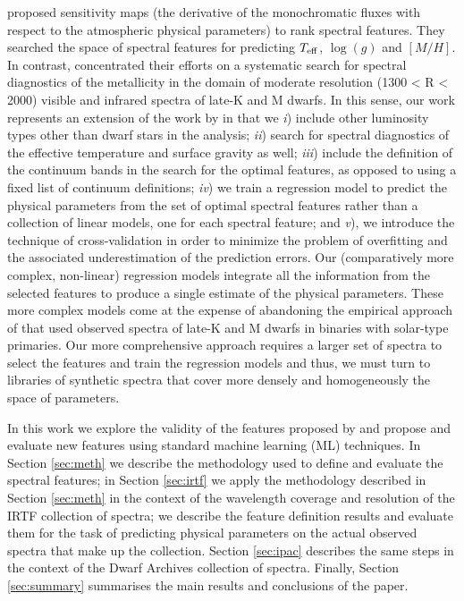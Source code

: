 \cite{cesetti} proposed sensitivity maps (the derivative of the
monochromatic fluxes with respect to the atmospheric physical
parameters) to rank spectral features. They searched the space of
spectral features for predicting $T_{\rm eff}$, $\log(g)$ and
$[M/H]$. In contrast, \cite{2013AJ....145...52M} concentrated their
efforts on a systematic search for spectral diagnostics of the
metallicity in the domain of moderate resolution (1300 < R < 2000)
visible and infrared spectra of late-K and M dwarfs. In this sense,
our work represents an extension of the work
by \cite{2013AJ....145...52M} in that we {\it i}) include other
luminosity types other than dwarf stars in the analysis; {\it ii})
search for spectral diagnostics of the effective temperature and
surface gravity as well; {\it iii}) include the definition of the
continuum bands in the search for the optimal features, as opposed to
using a fixed list of continuum definitions; {\it iv}) we train a
regression model to predict the physical parameters from the set of
optimal spectral features rather than a collection of linear models,
one for each spectral feature; and {\it v}), we introduce the
technique of cross-validation in order to minimize the problem of
overfitting \citep[see e.g.][]{gelman2013bayesian} and the associated
underestimation of the prediction errors. Our (comparatively more
complex, non-linear) regression models integrate all the information
from the selected features to produce a single estimate of the
physical parameters. These more complex models come at the expense of
abandoning the empirical approach of \cite{2013AJ....145...52M} that
used observed spectra of late-K and M dwarfs in binaries with
solar-type primaries. Our more comprehensive approach requires a
larger set of spectra to select the features and train the regression
models and thus, we must turn to libraries of synthetic spectra that
cover more densely and homogeneously the space of parameters.

In this work we explore the validity of the features proposed
by \cite{cesetti} and propose and evaluate new features using standard
machine learning (ML) techniques. In Section \ref{sec:meth} we
describe the methodology used to define and evaluate the spectral
features; in Section \ref{sec:irtf} we apply the methodology described
in Section \ref{sec:meth} in the context of the wavelength coverage
and resolution of the IRTF collection of spectra; we describe the
feature definition results and evaluate them for the task of
predicting physical parameters on the actual observed spectra that
make up the collection. Section \ref{sec:ipac} describes the same
steps in the context of the Dwarf Archives collection of
spectra. Finally, Section \ref{sec:summary} summarises the main
results and conclusions of the paper.
